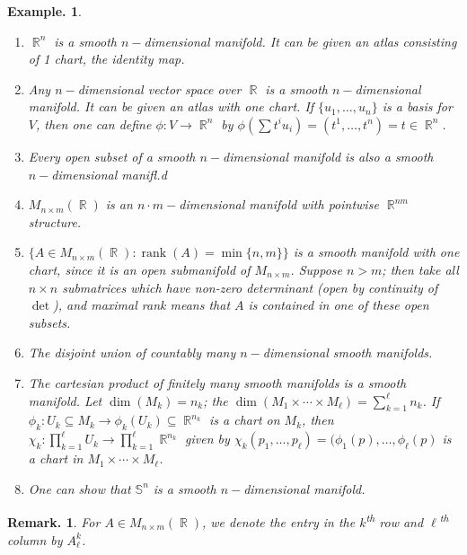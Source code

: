 \documentclass[11pt, a4paper]{memoir}
\DeclareMathOperator{\R}{{\mathbb{R}}}
\theoremstyle{change}
\theoremstyle{plain}
\theoremstyle{nonumberplain}
\newtheorem{example}{Example.}
\newtheorem{remark}{Remark.}
\DeclareMathOperator{\rank}{rank}
\numberwithin{equation}{section}
\begin{document}
\begin{example}
    \begin{enumerate}[nl]
        \item $\R^n$ is a smooth $n-$dimensional manifold.
            It can be given an atlas consisting of 1 chart, the identity map.
        \item Any $n-$dimensional vector space over $\R$ is a smooth $n-$dimensional manifold.
            It can be given an atlas with one chart.
            If $\{u_1,\ldots,u_n\}$ is a basis for $V$, then one can define $\phi:V\to\R^n$ by $\phi(\sum t^iu_i)=(t^1,\ldots,t^n)=t\in\R^n$.
        \item Every open subset of a smooth $n-$dimensional manifold is also a smooth $n-$dimensional manifl.d
        \item $M_{n\times m}(\R)$ is an $n\cdot m-$dimensional manifold with pointwise $\R^{nm}$ structure.
        \item $\{A\in M_{n\times m}(\R):\rank(A)=\min\{n,m\}\}$ is a smooth manifold with one chart, since it is an open submanifold of $M_{n\times m}$.
            Suppose $n>m$; then take all $n\times n$ submatrices which have non-zero determinant (open by continuity of $\det$), and maximal rank means that $A$ is contained in one of these open subsets.
        \item The disjoint union of countably many $n-$dimensional smooth manifolds.
        \item The cartesian product of finitely many smooth manifolds is a smooth manifold.
            Let $\dim(M_k)=n_k$; the  $\dim(M_1\times\cdots\times M_\ell)=\sum_{k=1}^\ell n_k$.
            If $\phi_k:U_k\subseteq M_k\to\phi_k(U_k)\subseteq\R^{n_k}$ is a chart on $M_k$, then $\chi_k:\prod_{k=1}^\ell U_k\to\prod_{k=1}^\ell\R^{n_k}$ given by $\chi_k(p_1,\ldots,p_\ell)=(\phi_1(p),\ldots,\phi_\ell(p)$ is a chart in $M_1\times\cdots\times M_\ell$.
        \item One can show that $\mathbb{S}^n$ is a smooth $n-$dimensional manifold.
    \end{enumerate}
\end{example}
\begin{remark}
    For $A\in M_{n\times m}(\R)$, we denote the entry in the $k$\textsuperscript{th} row and $\ell$\textsuperscript{th} column by $A_\ell^k$.
\end{remark}
\end{document}
